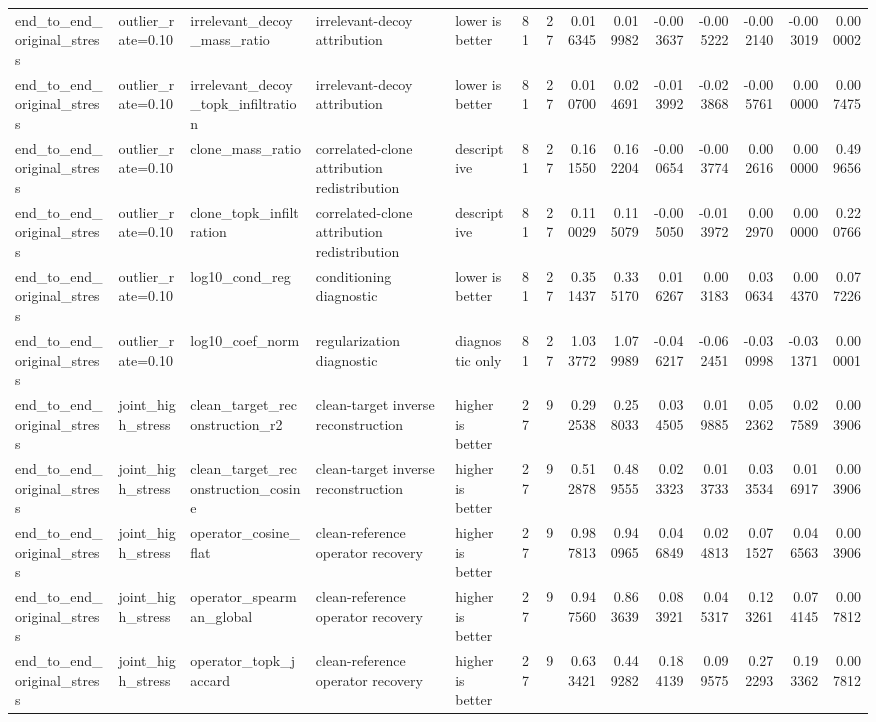 \begin{table}[t]
\begin{tabular}{lllllrrrrrrrrr}
end_to_end_original_stress & outlier_rate=0.10 & irrelevant_decoy_mass_ratio & irrelevant-decoy attribution & lower is better & 81 & 27 & 0.016345 & 0.019982 & -0.003637 & -0.005222 & -0.002140 & -0.003019 & 0.000002 \\
end_to_end_original_stress & outlier_rate=0.10 & irrelevant_decoy_topk_infiltration & irrelevant-decoy attribution & lower is better & 81 & 27 & 0.010700 & 0.024691 & -0.013992 & -0.023868 & -0.005761 & 0.000000 & 0.007475 \\
end_to_end_original_stress & outlier_rate=0.10 & clone_mass_ratio & correlated-clone attribution redistribution & descriptive & 81 & 27 & 0.161550 & 0.162204 & -0.000654 & -0.003774 & 0.002616 & 0.000000 & 0.499656 \\
end_to_end_original_stress & outlier_rate=0.10 & clone_topk_infiltration & correlated-clone attribution redistribution & descriptive & 81 & 27 & 0.110029 & 0.115079 & -0.005050 & -0.013972 & 0.002970 & 0.000000 & 0.220766 \\
end_to_end_original_stress & outlier_rate=0.10 & log10_cond_reg & conditioning diagnostic & lower is better & 81 & 27 & 0.351437 & 0.335170 & 0.016267 & 0.003183 & 0.030634 & 0.004370 & 0.077226 \\
end_to_end_original_stress & outlier_rate=0.10 & log10_coef_norm & regularization diagnostic & diagnostic only & 81 & 27 & 1.033772 & 1.079989 & -0.046217 & -0.062451 & -0.030998 & -0.031371 & 0.000001 \\
end_to_end_original_stress & joint_high_stress & clean_target_reconstruction_r2 & clean-target inverse reconstruction & higher is better & 27 & 9 & 0.292538 & 0.258033 & 0.034505 & 0.019885 & 0.052362 & 0.027589 & 0.003906 \\
end_to_end_original_stress & joint_high_stress & clean_target_reconstruction_cosine & clean-target inverse reconstruction & higher is better & 27 & 9 & 0.512878 & 0.489555 & 0.023323 & 0.013733 & 0.033534 & 0.016917 & 0.003906 \\
end_to_end_original_stress & joint_high_stress & operator_cosine_flat & clean-reference operator recovery & higher is better & 27 & 9 & 0.987813 & 0.940965 & 0.046849 & 0.024813 & 0.071527 & 0.046563 & 0.003906 \\
end_to_end_original_stress & joint_high_stress & operator_spearman_global & clean-reference operator recovery & higher is better & 27 & 9 & 0.947560 & 0.863639 & 0.083921 & 0.045317 & 0.123261 & 0.074145 & 0.007812 \\
end_to_end_original_stress & joint_high_stress & operator_topk_jaccard & clean-reference operator recovery & higher is better & 27 & 9 & 0.633421 & 0.449282 & 0.184139 & 0.099575 & 0.272293 & 0.193362 & 0.007812 \\

\end{tabular}
\end{table}

